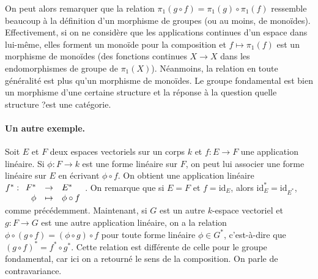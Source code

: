 \documentclass{article}
\newcommand{\id}{\mathrm{id}}
\newcommand{\applic}[4]{\begin{array}[t]{rcl}
#1 & \to & #2 \\
#3 & \mapsto & #4
\end{array}}
\theoremstyle{plain}
\theoremstyle{definition}
\theoremstyle{remark}
\begin{document}
On peut alors remarquer que la relation $\pi_1(g\circ f) = \pi_1(g) \circ \pi_1(f)$ ressemble beaucoup à la définition d'un morphisme de groupes (ou au moins, de monoïdes). Effectivement, si on ne considère que les applications continues d'un espace dans lui-même, elles forment un monoïde pour la composition et $f \mapsto \pi_1(f)$ est un morphisme de monoïdes (des fonctions continues $X \to X$ dans les endomorphismes de groupe de $\pi_1(X)$). Néanmoins, la relation en toute généralité est plus qu'un morphisme de monoïdes. Le groupe fondamental est bien un morphisme d'une certaine structure et la réponse à la question \og quelle structure ?\fg est \og une catégorie\fg.
\paragraph{Un autre exemple.} Soit $E$ et $F$ deux espaces vectoriels sur un corps $k$ et $f : E \to F$ une application linéaire. Si $\phi : F \to k$ est une forme linéaire sur $F$, on peut lui associer une forme linéaire sur $E$ en écrivant $\phi \circ f$. On obtient une application linéaire $f^* : \applic{F^*}{E^*}{\phi}{\phi \circ f}$. On remarque que si $E = F$ et $f = \id_E$, alors $\id_E^* = \id_{E^*}$, comme précédemment. Maintenant, si $G$ est un autre $k$-espace vectoriel et $g : F \to G$ est une autre application linéaire, on a la relation $\phi \circ (g\circ f) = (\phi \circ g) \circ f$ pour toute forme linéaire $\phi \in G^*$, c'est-à-dire que $(g \circ f)^* = f^* \circ g^*$. Cette relation est différente de celle pour le groupe fondamental, car ici on a retourné le sens de la composition. On parle de \og contravariance\fg.
\end{document}
